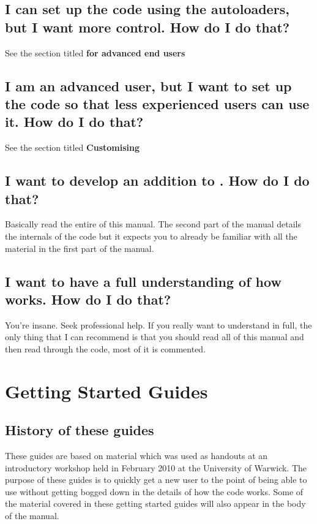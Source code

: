 \documentclass[12pt,a4paper]{article}
\newcommand{\EPOCH}{{\color{warwickdark}\fontfamily{phv}\selectfont{EPOCH}}}
\begin{document}
\subsection{I can set up the code using the autoloaders, but I want more
  control. How do I do that?}
See the section titled {\bf {\EPOCH} for advanced end users}

\subsection{I am an advanced user, but I want to set up the code so that less
  experienced users can use it. How do I do that?}
See the section titled {\bf Customising {\EPOCH}}

\subsection{I want to develop an addition to \EPOCH. How do I do that?}
Basically read the entire of this manual. The second part of the manual details
the internals of the code but it expects you to already be familiar with all
the material in the first part of the manual.

\subsection{I want to have a full understanding of how {\EPOCH} works. How do I
  do that?}
You're insane. Seek professional help. If you really want to understand {\EPOCH}
in full, the only thing that I can recommend is that you should read all of
this manual and then read through the code, most of it is commented.
\pagebreak

\section{Getting Started Guides}

\subsection{History of these guides}
These guides are based on material which was used as handouts at an {\EPOCH}
introductory workshop held in February 2010 at the University of Warwick. The
purpose of these guides is to quickly get a new user to the point of being able
to use {\EPOCH} without getting bogged down in the details of how the code
works. Some of the material covered in these getting started guides will also
appear in the body of the manual.
\end{document}
